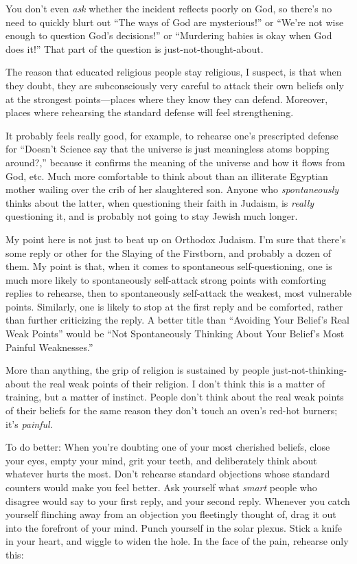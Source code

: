 {
 You don't even \textit{ask} whether the incident
reflects poorly on God, so there's no need to quickly
blurt out ``The ways of God are
mysterious!'' or
``We're not wise enough to question
God's decisions!'' or
``Murdering babies is okay when God does
it!'' That part of the question is
just-not-thought-about.}

{
 The reason that educated religious people stay religious, I
suspect, is that when they doubt, they are subconsciously very careful
to attack their own beliefs only at the strongest points---places where
they know they can defend. Moreover, places where rehearsing the
standard defense will feel strengthening.}

{
 It probably feels really good, for example, to rehearse
one's prescripted defense for
``Doesn't Science say that the
universe is just meaningless atoms bopping around?,''
because it confirms the meaning of the universe and how it flows from
God, etc. Much more comfortable to think about than an illiterate
Egyptian mother wailing over the crib of her slaughtered son. Anyone
who \textit{spontaneously} thinks about the latter, when questioning
their faith in Judaism, is \textit{really} questioning it, and is
probably not going to stay Jewish much longer.}

{
 My point here is not just to beat up on Orthodox Judaism.
I'm sure that there's some reply or
other for the Slaying of the Firstborn, and probably a dozen of them.
My point is that, when it comes to spontaneous self-questioning, one is
much more likely to spontaneously self-attack strong points with
comforting replies to rehearse, then to spontaneously self-attack the
weakest, most vulnerable points. Similarly, one is likely to stop at
the first reply and be comforted, rather than further criticizing the
reply. A better title than ``Avoiding Your
Belief's Real Weak Points'' would be
``Not Spontaneously Thinking About Your
Belief's Most Painful Weaknesses.''}

{
 More than anything, the grip of religion is sustained by people
just-not-thinking-about the real weak points of their religion. I
don't think this is a matter of training, but a matter
of instinct. People don't think about the real weak
points of their beliefs for the same reason they don't
touch an oven's red-hot burners; it's
\textit{painful.}}

{
 To do better: When you're doubting one of your
most cherished beliefs, close your eyes, empty your mind, grit your
teeth, and deliberately think about whatever hurts the most.
Don't rehearse standard objections whose standard
counters would make you feel better. Ask yourself what \textit{smart}
people who disagree would say to your first reply, and your second
reply. Whenever you catch yourself flinching away from an objection you
fleetingly thought of, drag it out into the forefront of your mind.
Punch yourself in the solar plexus. Stick a knife in your heart, and
wiggle to widen the hole. In the face of the pain, rehearse only this:}

